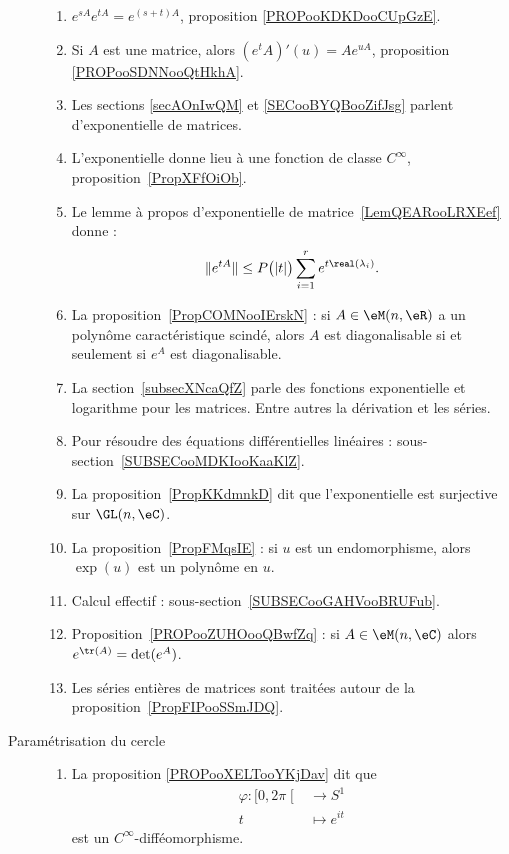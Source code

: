 \begin{description}
		\begin{enumerate}
			\item
			      \( e^{sA} e^{tA}= e^{(s+t)A}\), proposition \ref{PROPooKDKDooCUpGzE}.
			\item
			      Si \( A\) est une matrice, alors \( (e^tA)'(u)=Ae^{uA}\), proposition \ref{PROPooSDNNooQtHkhA}.
			\item
			      Les sections \ref{secAOnIwQM} et \ref{SECooBYQBooZifJsg} parlent d'exponentielle de matrices.
			\item
			      L'exponentielle donne lieu à une fonction de classe \(  C^{\infty}\), proposition~\ref{PropXFfOiOb}.
			\item
			      Le lemme à propos d'exponentielle de matrice~\ref{LemQEARooLRXEef} donne :
			      \begin{equation*}
				      \|  e^{tA} \|\leq P\big( | t | \big)\sum_{i=1}^r e^{t\real(\lambda_i)}.
			      \end{equation*}
			\item
			      La proposition~\ref{PropCOMNooIErskN} : si \( A\in \eM(n,\eR)\) a un polynôme caractéristique scindé, alors \( A\) est diagonalisable si et seulement si \( e^A\) est diagonalisable.
			\item
			      La section~\ref{subsecXNcaQfZ} parle des fonctions exponentielle et logarithme pour les matrices. Entre autres la dérivation et les séries.
			\item
			      Pour résoudre des équations différentielles linéaires : sous-section~\ref{SUBSECooMDKIooKaaKlZ}.
			\item
			      La proposition~\ref{PropKKdmnkD} dit que l'exponentielle est surjective sur \( \GL(n,\eC)\).
			\item

			      La proposition~\ref{PropFMqsIE} : si \( u\) est un endomorphisme, alors \( \exp(u)\) est un polynôme en \( u\).
			\item
			      Calcul effectif : sous-section~\ref{SUBSECooGAHVooBRUFub}.
			\item Proposition~\ref{PROPooZUHOooQBwfZq} : si \( A\in\eM(n,\eC)\) alors \( e^{\tr(A)}=\det( e^{A})\).
			\item
			      Les séries entières de matrices sont traitées autour de la proposition~\ref{PropFIPooSSmJDQ}.
		\end{enumerate}

	\item[Paramétrisation du cercle]
		\begin{enumerate}
			\item
			      La proposition \ref{PROPooXELTooYKjDav} dit que
			      \begin{equation}
				      \begin{aligned}
					      \varphi\colon \mathopen[ 0,2\pi\mathclose[ & \to S^1        \\
					      t                                          & \mapsto e^{it}
				      \end{aligned}
			      \end{equation}
			      est un \( C^{\infty}\)-difféomorphisme.
		\end{enumerate}

\end{description}
